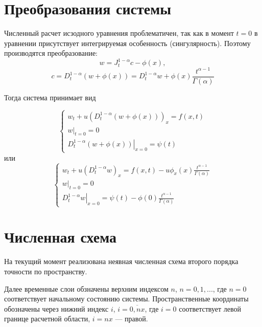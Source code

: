 \section{Преобразования системы}
Численный расчет исзодного уравнения проблематичен, так как в момент $t=0$ в уравнении присутствует интегрируемая особенность (сингулярность). Поэтому производятся преобразование:
\begin{equation}
	w = J^{1-\alpha}_t c - \phi(x),
\end{equation}
\begin{equation}
	c = D^{1-\alpha}_t \left( w + \phi(x) \right)
	= D^{1-\alpha}_t w + \phi(x) \frac{t^{\alpha - 1}}{\Gamma(\alpha)}
\end{equation}


Тогда система принимает вид

\begin{equation}
	\begin{cases}
		w_t + u \left( D^{1-\alpha}_t \left( w + \phi\left(x\right) \right) \right)_x = f(x,t)\\
		\left.w\right|_{t=0} = 0\\
		\left.D^{1-\alpha}_t \left( w + \phi(x) \right) \right|_{x=0} = \psi(t)
	\end{cases}
\end{equation}
или
\begin{equation}
	\label{eq:num1}
	\begin{cases}
		w_t + u \left( D^{1-\alpha}_t w\right)_x
		= f(x,t) - u \phi_x\left(x\right)\frac{t^{\alpha - 1}}{\Gamma(\alpha)}\\
		\left.w\right|_{t=0} = 0\\
		\left.D^{1-\alpha}_t w \right|_{x=0}
		= \psi(t) - \phi(0) \frac{t^{\alpha - 1}}{\Gamma(\alpha)}
	\end{cases}
\end{equation}

\section{Численная схема}
На текущий момент реализована неявная численная схема второго порядка точности по пространству.

Далее временные слои обзначены верхним индексом $n$, $n=0,1,...$, где $n=0$ соответствует начальному состоянию системы. Пространственные координаты обозначены через нижний индекс $i$, $i=\overline{0,nx}$, где $i=0$ соответствует левой границе расчетной области, $i=nx$ --- правой.

